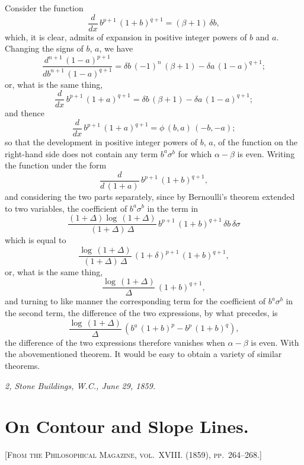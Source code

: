\documentclass[11pt,a4paper]{article}
\begin{document}
\medskip
Consider the function
\[
\frac{d}{dx}\,b^{p+1}\,(1+b)^{q+1} = (\beta+1)\,\delta b,
\]
which, it is clear, admits of expansion in positive integer powers of $b$ and $a$. Changing the signs of $b$, $a$, we have
\[
\frac{d^{n+1}\,(1-a)^{p+1}}{db^{n+1}\,(1-a)^{q+1}} = \delta b\,(-1)^{n}\,(\beta+1) - \delta a\,(1-a)^{q+1};
\]
or, what is the same thing,
\[
\frac{d}{dx}\,b^{p+1}\,(1+a)^{q+1} = \delta b\,(\beta+1) - \delta a\,(1-a)^{q+1};
\]
and thence
\[
\frac{d}{dx}\,b^{p+1}\,(1+a)^{q+1} = \phi\,(b,a)\,(-b,-a);
\]
so that the development in positive integer powers of $b$, $a$, of the function on the right-hand side does not contain any term $b^a \sigma^b$ for which $\alpha - \beta$ is even. Writing the function under the form
\[
\frac{d}{d\,(1+a)}\,b^{p+1}\,(1+b)^{q+1},
\]
and considering the two parts separately, since by Bernoulli's theorem extended to two variables, the coefficient of $b^a \sigma^b$ in the term in
\[
\frac{(1+\Delta)\log\,(1+\Delta)}{(1+\Delta)\,\Delta}\,b^{p+1}\,(1+b)^{q+1}\,\delta b\,\delta\sigma
\]
which is equal to
\[
\frac{\log\,(1+\Delta)}{(1+\Delta)\,\Delta}\,(1+\delta)^{p+1}\,(1+b)^{q+1},
\]
or, what is the same thing,
\[
\frac{\log\,(1+\Delta)}{\Delta}\,(1+b)^{q+1},
\]
and turning to like manner the corresponding term for the coefficient of $b^a \sigma^b$ in the second term, the difference of the two expressions, by what precedes, is
\[
\frac{\log\,(1+\Delta)}{\Delta}\,(b^a\,(1+b)^p - b^p\,(1+b)^q),
\]
the difference of the two expressions therefore vanishes when $\alpha - \beta$ is even. With the abovementioned theorem. It would be easy to obtain a variety of similar theorems.

\smallskip
\noindent\textit{2, Stone Buildings, W.C., June 29, 1859.}

\newpage


\setcounter{page}{108}

\section*{On Contour and Slope Lines.}
\label{paper:246}

\textsc{[From the Philosophical Magazine, vol.~XVIII. (1859), pp.~264--268.]}
\end{document}
